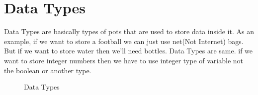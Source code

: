 \documentclass[A4 paper,openany]{book}  %
\begin{document}
\section{Data Types}
Data Types\cite{Ref6} are basically types of pots that are used to store data inside it. As an example, if we want to store a football we can just use net(Not Internet) bags.
But if we want to store water then we'll need bottles. Data Types are same. if we want to store integer numbers then we have to use integer type of variable not the boolean or another type.
% 
% 
\begin{figure}[htbp]
    \begin{center}
        \caption{Data Types\cite{Ref6}}
    \end{center}
\end{figure}
% 
% 
\end{document}
